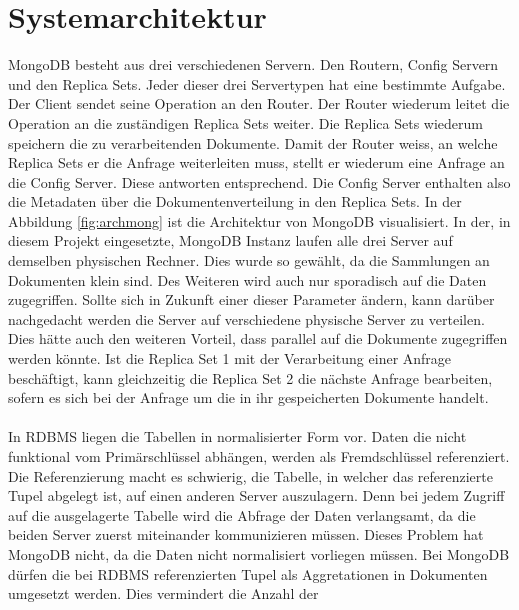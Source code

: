  \section{Systemarchitektur}
 MongoDB besteht aus drei verschiedenen Servern. Den Routern, Config Servern und
 den Replica Sets. Jeder dieser drei Servertypen hat eine bestimmte Aufgabe.
 Der Client sendet seine Operation an den Router. Der Router wiederum leitet
 die Operation an die zuständigen Replica Sets weiter. Die Replica Sets wiederum 
 speichern die zu verarbeitenden Dokumente. Damit der Router weiss, an welche
 Replica Sets er die Anfrage weiterleiten muss, stellt er wiederum eine Anfrage
 an die Config Server. Diese antworten entsprechend. Die Config Server enthalten 
 also die Metadaten über die Dokumentenverteilung in den Replica Sets.
 In der Abbildung \ref{fig:archmong} ist die Architektur von MongoDB
 visualisiert.
 In der, in diesem Projekt eingesetzte, MongoDB Instanz laufen alle drei Server
 auf demselben physischen Rechner. Dies wurde so gewählt, da die Sammlungen an
 Dokumenten klein sind. Des Weiteren wird auch nur sporadisch auf die Daten
 zugegriffen. Sollte sich in Zukunft einer dieser Parameter ändern, kann darüber
 nachgedacht werden die Server auf verschiedene physische Server zu
 verteilen. Dies hätte auch den weiteren Vorteil, dass parallel auf die
 Dokumente zugegriffen werden könnte. Ist die Replica Set 1 mit der Verarbeitung
 einer Anfrage beschäftigt, kann gleichzeitig die Replica Set 2 die nächste
 Anfrage bearbeiten, sofern es sich bei der Anfrage um die in ihr gespeicherten
 Dokumente handelt. \\\\
 In RDBMS liegen die Tabellen in normalisierter Form vor. Daten die nicht
 funktional vom Primärschlüssel abhängen, werden als Fremdschlüssel
 referenziert. Die Referenzierung macht es schwierig, die Tabelle, in
 welcher das referenzierte Tupel abgelegt ist, auf einen anderen Server
 auszulagern. Denn bei jedem Zugriff auf die ausgelagerte Tabelle wird die
 Abfrage der Daten verlangsamt, da die beiden Server zuerst miteinander kommunizieren müssen. Dieses Problem hat MongoDB nicht, da die Daten nicht normalisiert
 vorliegen müssen. Bei MongoDB dürfen die bei RDBMS referenzierten Tupel als
 Aggretationen in Dokumenten umgesetzt werden. Dies vermindert die Anzahl der
